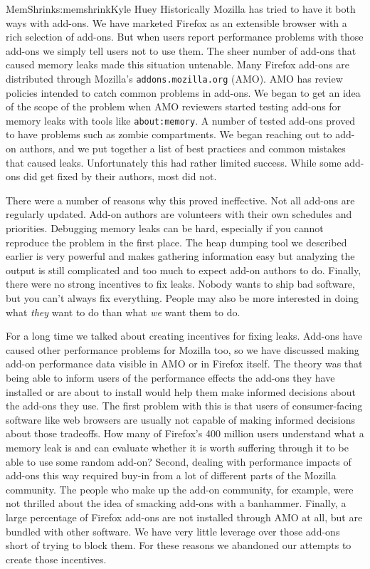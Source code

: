 \begin{aosachapter}{MemShrink}{s:memshrink}{Kyle Huey}
Historically Mozilla has tried to have it both ways with add-ons. We
have marketed Firefox as an extensible browser with a rich selection of
add-ons. But when users report performance problems with those add-ons
we simply tell users not to use them. The sheer number of add-ons that
caused memory leaks made this situation untenable. Many Firefox add-ons
are distributed through Mozilla's \texttt{addons.mozilla.org} (AMO). AMO
has review policies intended to catch common problems in add-ons. We
began to get an idea of the scope of the problem when AMO reviewers
started testing add-ons for memory leaks with tools like
\texttt{about:memory}. A number of tested add-ons proved to have
problems such as zombie compartments. We began reaching out to add-on
authors, and we put together a list of best practices and common
mistakes that caused leaks. Unfortunately this had rather limited
success. While some add-ons did get fixed by their authors, most did
not.

There were a number of reasons why this proved ineffective. Not all
add-ons are regularly updated. Add-on authors are volunteers with their
own schedules and priorities. Debugging memory leaks can be hard,
especially if you cannot reproduce the problem in the first place. The
heap dumping tool we described earlier is very powerful and makes
gathering information easy but analyzing the output is still complicated
and too much to expect add-on authors to do. Finally, there were no
strong incentives to fix leaks. Nobody wants to ship bad software, but
you can't always fix everything. People may also be more interested in
doing what \emph{they} want to do than what \emph{we} want them to do.

For a long time we talked about creating incentives for fixing leaks.
Add-ons have caused other performance problems for Mozilla too, so we
have discussed making add-on performance data visible in AMO or in
Firefox itself. The theory was that being able to inform users of the
performance effects the add-ons they have installed or are about to
install would help them make informed decisions about the add-ons they
use. The first problem with this is that users of consumer-facing
software like web browsers are usually not capable of making informed
decisions about those tradeoffs. How many of Firefox's 400 million users
understand what a memory leak is and can evaluate whether it is worth
suffering through it to be able to use some random add-on? Second,
dealing with performance impacts of add-ons this way required buy-in
from a lot of different parts of the Mozilla community. The people who
make up the add-on community, for example, were not thrilled about the
idea of smacking add-ons with a banhammer. Finally, a large percentage
of Firefox add-ons are not installed through AMO at all, but are bundled
with other software. We have very little leverage over those add-ons
short of trying to block them. For these reasons we abandoned our
attempts to create those incentives.


\end{aosachapter}
